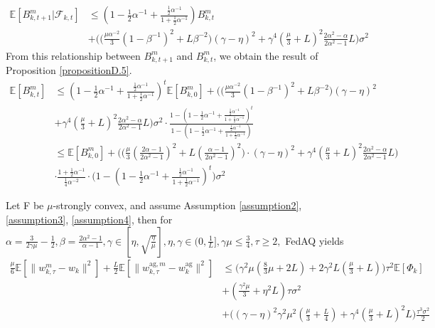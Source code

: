 \documentclass[11pt]{article}
\begin{document}
\begin{align*}
    \mathbb{E}[B_{k, t+1}^m|\mathcal{F}_{k, t}] &\leq (1-\frac{1}{2}\alpha^{-1}+\frac{\frac{1}{2}\alpha^{-1}}{1+\frac{1}{2}\alpha^{-1}})B_{k, t}^m \\
    &+ \bigg(\Big(\frac{\mu\alpha^{-2}}{3}(1-\beta^{-1})^2 + L\beta^{-2}\Big)(\gamma-\eta)^2+\gamma^4(\frac{\mu}{3}+L)^2\frac{2\alpha^2-\alpha}{2\alpha^2-1}L\bigg)\sigma^2
\end{align*}
From this relationship between $B_{k, t+1}^m$ and $B_{k, t}^m$, we obtain the result of Proposition \ref{propositionD.5}.
\begin{align*}
    \mathbb{E}[B_{k, t}^m] &\leq (1-\frac{1}{2}\alpha^{-1}+\frac{\frac{1}{2}\alpha^{-1}}{1+\frac{1}{2}\alpha^{-1}})^t\mathbb{E}[B_{k, 0}^m] + \bigg(\Big(\frac{\mu\alpha^{-2}}{3}(1-\beta^{-1})^2 + L\beta^{-2}\Big)(\gamma-\eta)^2 \\
    &+\gamma^4(\frac{\mu}{3}+L)^2\frac{2\alpha^2-\alpha}{2\alpha^2-1}L\bigg)\sigma^2 \cdot \frac{1-(1-\frac{1}{2}\alpha^{-1}+\frac{\frac{1}{2}\alpha^{-1}}{1+\frac{1}{2}\alpha^{-1}})^t}{1-(1-\frac{1}{2}\alpha^{-1}+\frac{\frac{1}{2}\alpha^{-1}}{1+\frac{1}{2}\alpha^{-1}})} \\
    &\leq \mathbb{E}[B_{k, 0}^m] + \bigg( \Big(\frac{\mu}{3} (\frac{2\alpha-1}{2\alpha^2 -1})^2 + L(\frac{\alpha-1}{2\alpha^2 -1})^2 \Big)\cdot(\gamma - \eta)^2+ \gamma^4 (\frac{\mu}{3} + L)^2 \frac{2\alpha^2 - \alpha}{2\alpha^2 - 1}L \bigg) \\
    &\cdot \frac{1 + \frac{1}{2}\alpha^{-1}}{\frac{1}{4}\alpha^{-2}} \cdot \Big( 1-(1-\frac{1}{2}\alpha^{-1}+\frac{\frac{1}{2}\alpha^{-1}}{1+\frac{1}{2}\alpha^{-1}})^t\Big)\sigma^2
\end{align*}

\begin{proposition} \label{propositionD.6}
Let F be $\mu$-strongly convex, and assume Assumption \ref{assumption2}, \ref{assumption3}, \ref{assumption4}, then for $\alpha=\frac{3}{2\gamma\mu} - \frac{1}{2}, \beta=\frac{2\alpha^2-1}{\alpha-1}, \gamma \in [\eta, \sqrt{\frac{\eta}{\mu}}], \eta, \gamma \in (0, \frac{1}{L}], \gamma\mu \leq \frac{3}{4},\tau \geq 2,$ FedAQ yields
\begin{align*}
    \frac{\mu}{6}\mathbb{E}[\|w_{k, \tau}^m - w_k\|^2] + \frac{L}{2} \mathbb{E}[\|w_{k, \tau}^{\textrm{ag}, m} - w_k^{\textrm{ag}}\|^2] &\leq \Big( \gamma^2\mu(\frac{8}{3}\mu + 2L) + 2\gamma^2L(\frac{\mu}{3}+L)\Big)\tau^2 \mathbb{E}[\Phi_k] \\
    &+ (\frac{\gamma^2\mu}{3}+\eta^2 L)\tau\sigma^2 \\
    &+ \Big( (\gamma-\eta)^2\gamma^2\mu^2(\frac{\mu}{3}+\frac{L}{4})+\gamma^4(\frac{\mu}{3}+L)^2 L \Big) \frac{\tau^3\sigma^2}{2}
\end{align*}
\end{proposition}
\end{document}
